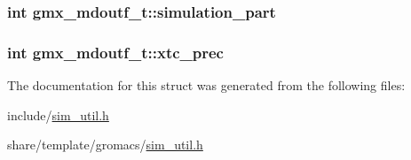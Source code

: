 \hypertarget{structgmx__mdoutf__t_afaf038c0c876959b77cc8fae2595868d}{
\subsubsection[{simulation\-\_\-part}]{\setlength{\rightskip}{0pt plus 5cm}int {\bf gmx\-\_\-mdoutf\-\_\-t\-::simulation\-\_\-part}}}\label{structgmx__mdoutf__t_afaf038c0c876959b77cc8fae2595868d}
\hypertarget{structgmx__mdoutf__t_af29479bb6c7d8179be6671cd9f439b2e}{
\subsubsection[{xtc\-\_\-prec}]{\setlength{\rightskip}{0pt plus 5cm}int {\bf gmx\-\_\-mdoutf\-\_\-t\-::xtc\-\_\-prec}}}\label{structgmx__mdoutf__t_af29479bb6c7d8179be6671cd9f439b2e}


\-The documentation for this struct was generated from the following files\-:\begin{DoxyCompactItemize}
\item 
include/\hyperlink{include_2sim__util_8h}{sim\-\_\-util.\-h}\item 
share/template/gromacs/\hyperlink{share_2template_2gromacs_2sim__util_8h}{sim\-\_\-util.\-h}\end{DoxyCompactItemize}
